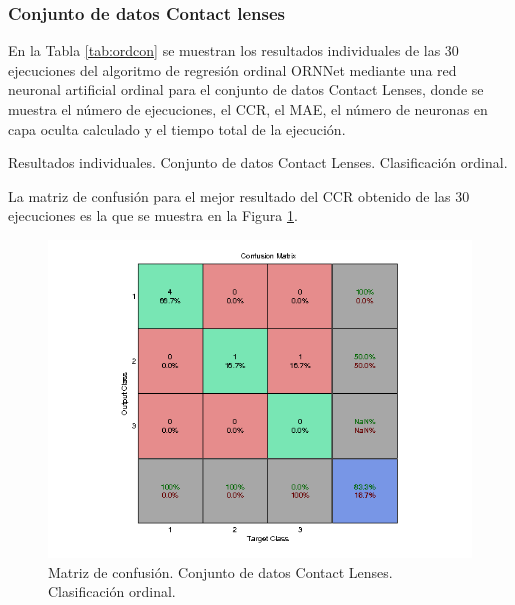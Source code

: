 			\subsubsection{Conjunto de datos Contact lenses}
			
			En la Tabla \ref{tab:ordcon} se muestran los resultados individuales de las 30 ejecuciones del algoritmo de regresión ordinal ORNNet mediante una red neuronal artificial ordinal para el conjunto de datos Contact Lenses, donde se muestra el número de ejecuciones, el CCR, el MAE, el número de neuronas en capa oculta calculado y el tiempo total de la ejecución.\\
			
			\begin{table}[!htbp]
				\centering
				\caption{Resultados individuales. Conjunto de datos Contact Lenses. Clasificación ordinal.}
				\label{tab:ordcon}
			\end{table}
			
			La matriz de confusión para el mejor resultado del CCR obtenido de las 30 ejecuciones es la que se muestra en la Figura \ref{fig:ordcon}.
			
			\begin{figure}[htbp]
				\centering
				\includegraphics[scale=0.8]{../src/results/ordinal/contact-lenses_mc1.png}
				\caption{Matriz de confusión. Conjunto de datos Contact Lenses. Clasificación ordinal.}
				\label{fig:ordcon}
			\end{figure}
			
